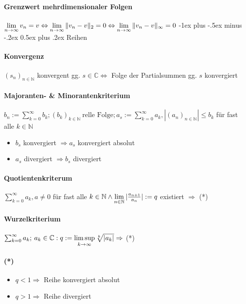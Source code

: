 \documentclass[paper=a4,paper=landscape, fontsize=6pt,DIV=25, twoside]{scrartcl}
\makeatletter
\newcommand{\compl}{\mathbb{C}}
\newcommand{\nat}{\mathbb{N}}
\newcommand{\aseq}{(a_n)_{n \in \nat}}
\newcommand{\srow}{(s_n)_{n \in \nat}}
\renewcommand{\section}{\@startsection{section}{1}{0mm}%
                                {-1ex plus -.5ex minus -.2ex}%
                                {0.5ex plus .2ex}%
                                {\normalfont\large\bfseries}}
\makeatother
\begin{document}
\begin{multicols*}{4}
		\paragraph{Grenzwert mehrdimensionaler Folgen}
		$\lim\limits_{n \rightarrow \infty} v_n = v \Leftrightarrow \lim\limits_{n \rightarrow \infty} \Arrowvert v_n - v\Arrowvert_2 = 0 \Leftrightarrow \lim\limits_{n \rightarrow \infty} \Arrowvert v_n - v\Arrowvert_\infty = 0$
	\section{Reihen}
		\paragraph{Konvergenz} $\srow$ konvergent gg. $s \in \compl \Leftrightarrow$ Folge der Partialsummen gg. $s$ konvergiert
		\paragraph{Majoranten- \& Minorantenkriterium}$ b_n := \sum_{k=0}^{\infty} b_k; (b_k)_{k \in \nat}\:\text{relle Folge}; a_s := \sum_{k=0}^{\infty} a_k, |\aseq| \leq b_k$ für fast alle $k \in \nat$
		\begin{itemize}[noitemsep,nolistsep]
			\item $b_s$ konvergiert $\Rightarrow a_s$ konvergiert absolut
			\item $a_s$ divergiert $\Rightarrow b_s$ divergiert
		\end{itemize}
		\paragraph{Quotientenkriterum}
		$ \sum_{k=0}^{\infty} a_k, a \neq 0$ für fast alle $k \in \nat \wedge \lim\limits_{n \in \nat} \arrowvert \frac{a_{n+1}}{a_n} \arrowvert := q$ existiert $\Rightarrow$ (*)
		\paragraph{Wurzelkriterium}
		$ \sum_{k=0}^{\infty} a_k;\:a_k \in \compl: q := \limsup\limits_{k \rightarrow \infty} \sqrt[k]{\arrowvert a_k \arrowvert} \Rightarrow$ (*)
		\paragraph{(*)}
		\begin{itemize}[noitemsep,nolistsep]
			\item $q < 1 \Rightarrow$ Reihe konvergiert absolut
			\item $q > 1 \Rightarrow$ Reihe divergiert
		\end{itemize}

\end{multicols*}
\end{document}
